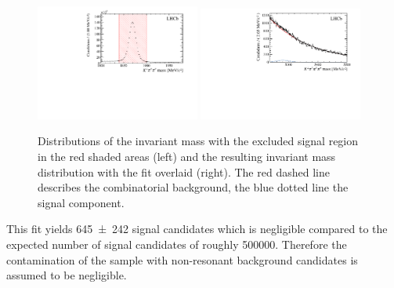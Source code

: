 \begin{figure}[tb]
    \centering
    \includegraphics[width=0.48\textwidth]{06selection/figs/DmassCut.pdf}
    \includegraphics[width=0.48\textwidth]{06selection/figs/Resulting_Bmass.pdf}
    \caption{Distributions of the invariant \Dm mass with the excluded signal region in the red shaded areas (left) and the resulting invariant \Bz mass distribution with the fit overlaid (right). The red dashed line describes the combinatorial background, the blue dotted line the signal component.}
    \label{fig:nonRes_Try2}
\end{figure}
This fit yields \num{645\pm242} signal candidates which is negligible compared to the expected number of \BdToDpi signal candidates of roughly \num{500000}.
Therefore the contamination of the sample with non-resonant background candidates is assumed to be negligible.
